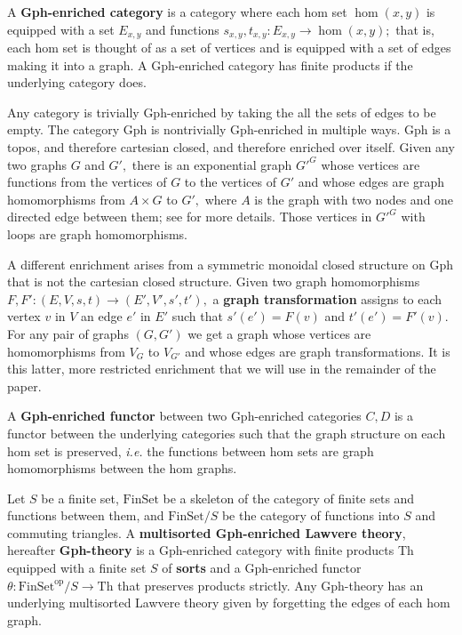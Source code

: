 \documentclass[a4paper,UKenglish]{lipics-v2016}
\newcommand{\maps}{\colon}
\newcommand{\Th}{\mathrm{Th}}
\newcommand{\FinSet}{\mathrm{FinSet}}
\newcommand{\op}{\mathrm{op}}
\begin{document}
A {\bf Gph-enriched category} is a category where each hom set $\hom(x,y)$ is equipped with a set $E_{x,y}$ and functions $s_{x,y}, t_{x,y}\maps E_{x,y} \to \hom(x,y);$ that is, each hom set is thought of as a set of vertices and is equipped with a set of edges making it into a graph.  A Gph-enriched category has finite products if the underlying category does.

Any category is trivially Gph-enriched by taking the all the sets of edges to be empty.  The category Gph is nontrivially Gph-enriched in multiple ways.  Gph is a topos, and therefore cartesian closed, and therefore enriched over itself.  Given any two graphs $G$ and $G',$ there is an exponential graph $G'^G$ whose vertices are functions from the vertices of $G$ to the vertices of $G'$ and whose edges are graph homomorphisms from $A \times G$ to $G',$ where $A$ is the graph with two nodes and one directed edge between them; see \cite{VignaGuidedTour} for more details.  Those vertices in $G'^G$ with loops are graph homomorphisms.

A different enrichment arises from a symmetric monoidal closed structure on Gph that is not the cartesian closed structure.  Given two graph homomorphisms $F, F'\maps (E, V, s, t) \to (E', V', s', t'),$ a {\bf graph transformation} assigns to each vertex $v$ in $V$ an edge $e'$ in $E'$ such that $s'(e') = F(v)$ and $t'(e') = F'(v).$  For any pair of graphs $(G, G')$ we get a graph whose vertices are homomorphisms from $V_G$ to $V_{G'}$ and whose edges are graph transformations.  It is this latter, more restricted enrichment that we will use in the remainder of the paper.

A {\bf Gph-enriched functor} between two Gph-enriched categories $C, D$ is a functor between the underlying categories such that the graph structure on each hom set is preserved, {\em i.e.} the functions between hom sets are graph homomorphisms between the hom graphs.

Let $S$ be a finite set, $\FinSet$ be a skeleton of the category of finite sets and functions between them, and $\FinSet/S$ be the category of functions into $S$ and commuting triangles.  A {\bf multisorted Gph-enriched Lawvere theory}, hereafter {\bf Gph-theory} is a Gph-enriched category with finite products Th equipped with a finite set $S$ of {\bf sorts} and a Gph-enriched functor $\theta\maps \FinSet^{\op}/S \to \Th$ that preserves products strictly.  Any Gph-theory has an underlying multisorted Lawvere theory given by forgetting the edges of each hom graph.
\end{document}
